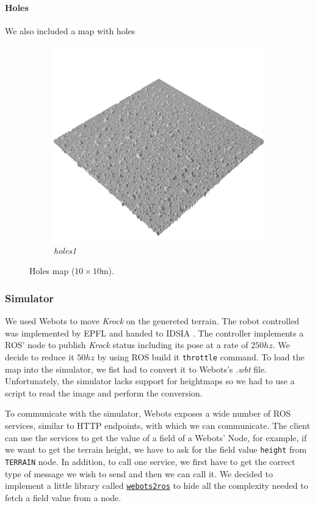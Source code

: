 \documentclass[../document.tex]{subfiles}
\begin{document}
\paragraph{Holes} We also included a map with holes
\begin{figure}[H]
    \centering
        \begin{subfigure}[b]{0.32\textwidth}
            \includegraphics[width=\textwidth]{../img/hm3d/holes1.png}
            \caption{\emph{holes1}}
        \end{subfigure}
\caption{Holes map ($10\times10$m).}
\end{figure}
\subsubsection{Simulator}
We used Webots to move \emph{Krock} on the genereted terrain. The robot controlled was implemented by EPFL  and handed to IDSIA . The controller implements a ROS' node to publish \emph{Krock} status including its pose at a rate of $250hz$. We decide to reduce it $50hz$ by using ROS build it \texttt{throttle} command. 
To load the map into the simulator, we fist had to convert it to Webots's \emph{.wbt} file. Unfortunately, the simulator lacks support for heightmaps so we had to use a script to read the image and perform the conversion.

To communicate with the simulator, Webots exposes a wide number of ROS services, similar to HTTP endpoints, with which we can communicate. The client can use the services to get the value of a field of a Webots' Node, for example, if we want to get the terrain height, we have to ask for the field value \texttt{height} from \texttt{TERRAIN} node. In addition, to call one service, we first have to get the correct type of message we wish to send and then we can call it. We decided to implement a little library called \href{https://github.com/FrancescoSaverioZuppichini/Master-Thesis/tree/master/core/utilities/webots2ros}{\texttt{webots2ros}} to hide all the complexity needed to fetch a field value from a node.
\end{document}

